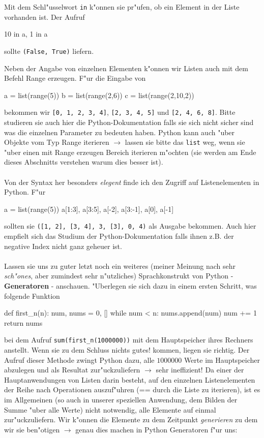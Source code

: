 \documentclass{article}
\begin{document}
Mit dem Schl"usselwort \verb+in+ k"onnen sie pr"ufen, ob ein Element in der Liste vorhanden ist. Der Aufruf
\begin{python}
10 in a, 1 in a
\end{python}
sollte \verb+(False, True)+ liefern.

Neben der Angabe von einzelnen Elementen k"onnen wir Listen auch mit dem Befehl Range erzeugen.
F"ur die Eingabe von
\begin{python}
a = list(range(5))
b = list(range(2,6))
c = list(range(2,10,2))
\end{python}
bekommen wir \verb+[0, 1, 2, 3, 4]+, \verb+[2, 3, 4, 5]+ und \verb+[2, 4, 6, 8]+. Bitte studieren sie
auch hier die Python-Dokumentation \cite{pythonwebsite} falls sie sich nicht sicher sind was die einzelnen Parameter zu bedeuten haben. Python kann auch "uber Objekte vom Typ Range iterieren $\rightarrow$ lassen sie bitte das \verb+list+ weg, wenn sie "uber einen mit Range erzeugen Bereich iterieren m"ochten (sie werden am Ende dieses Abschnitts verstehen warum dies besser ist).
\\\\
Von der Syntax her besonders \textit{elegent} finde ich den Zugriff auf Listenelementen in Python. F"ur
\begin{python}
a = list(range(5))
a[1:3], a[3:5], a[-2], a[3:-1], a[0], a[-1]
\end{python}
sollten sie \verb+([1, 2], [3, 4], 3, [3], 0, 4)+  als Ausgabe bekommen. Auch hier empfielt sich das Studium der Python-Dokumentation \cite{pythonwebsite} falls ihnen z.B. der negative Index nicht ganz geheuer ist.
\\\\
Lassen sie uns zu guter letzt noch ein weiteres (meiner Meinung nach sehr \textit{sch"ones}, aber zumindest sehr n"utzliches) Sprachkonstrukt von Python - \textbf{Generatoren} - anschauen. "Uberlegen sie sich dazu in einem ersten Schritt, was folgende Funktion 
\begin{python}
def first_n(n):
   num, nums = 0, []
   while num < n:
       nums.append(num)
       num += 1
   return nums
\end{python}
bei dem Aufruf \verb+sum(first_n(1000000))+ mit dem Hauptspeicher ihres Rechners \glqq anstellt\grqq{}. Wenn sie zu dem Schluss \glqq nichts gutes!\grqq{} kommen, liegen sie richtig. Der Aufruf dieser Methode \glqq zwingt\grqq{} Python dazu, alle $1000000$ Werte im Hauptspeicher abzulegen und als Resultat zur"uckzuliefern $\rightarrow$ sehr ineffizient! Da einer der Hauptanwendungen von Listen darin besteht, auf den einzelnen Listenelementen \glqq der Reihe nach\grqq{} Operationen auszuf"uhren (== durch die Liste zu iterieren), ist es im Allgemeinen (so auch in unserer speziellen Anwendung, dem Bilden der Summe "uber alle Werte) nicht notwendig, alle Elemente auf einmal zur"uckzuliefern. Wir k"onnen die Elemente zu dem Zeitpunkt \textit{generieren} zu dem wir sie ben"otigen $\rightarrow$ genau dies machen in Python Generatoren f"ur uns:
\end{document}
